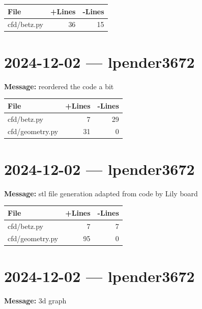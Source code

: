 \documentclass{article}
\begin{document}
\begin{longtable}{|p{10cm}|r|r|}
\hline \textbf{File} & \textbf{+Lines} & \textbf{-Lines} \\
\hline
cfd/betz.py & 36 & 15 \\
\hline
\end{longtable}

\section*{2024-12-02 --- lpender3672}
\textbf{Message:} reordered the code a bit

\begin{longtable}{|p{10cm}|r|r|}
\hline \textbf{File} & \textbf{+Lines} & \textbf{-Lines} \\
\hline
cfd/betz.py & 7 & 29 \\
\hline
cfd/geometry.py & 31 & 0 \\
\hline
\end{longtable}

\section*{2024-12-02 --- lpender3672}
\textbf{Message:} stl file generation adapted from code by Lily board

\begin{longtable}{|p{10cm}|r|r|}
\hline \textbf{File} & \textbf{+Lines} & \textbf{-Lines} \\
\hline
cfd/betz.py & 7 & 7 \\
\hline
cfd/geometry.py & 95 & 0 \\
\hline
\end{longtable}

\section*{2024-12-02 --- lpender3672}
\textbf{Message:} 3d graph
\end{document}
